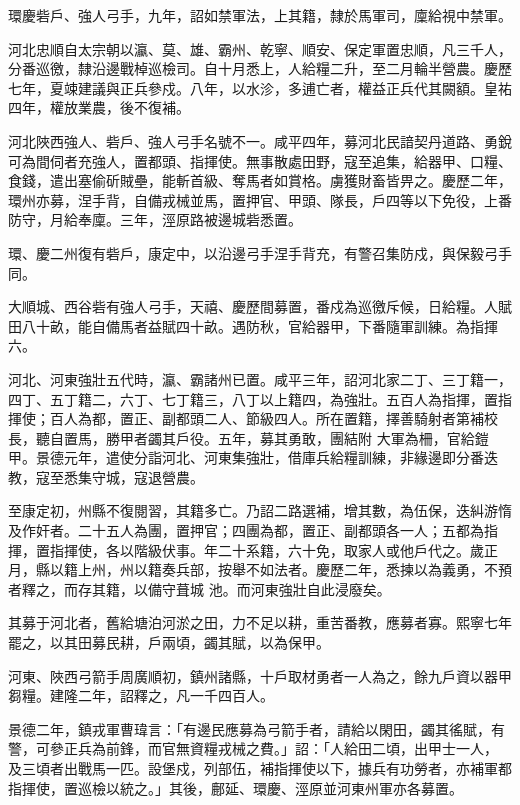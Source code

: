 \begin{pinyinscope}
 環慶砦戶、強人弓手，九年，詔如禁軍法，上其籍，隸於馬軍司，廩給視中禁軍。



 河北忠順自太宗朝以瀛、莫、雄、霸州、乾寧、順安、保定軍置忠順，凡三千人，分番巡徼，隸沿邊戰棹巡檢司。自十月悉上，人給糧二升，至二月輪半營農。慶歷七年，夏竦建議與正兵參戍。八年，以水沴，多逋亡者，權益正兵代其闕額。皇祐四年，權放業農，後不復補。



 河北陜西強人、砦戶、強人弓手名號不一。咸平四年，募河北民諳契丹道路、勇銳可為間伺者充強人，置都頭、指揮使。無事散處田野，寇至追集，給器甲、口糧、食錢，遣出塞偷斫賊壘，能斬首級、奪馬者如賞格。虜獲財畜皆畀之。慶歷二年，環州亦募，涅手背，自備戎械並馬，置押官、甲頭、隊長，戶四等以下免役，上番防守，月給奉廩。三年，涇原路被邊城砦悉置。



 環、慶二州復有砦戶，康定中，以沿邊弓手涅手背充，有警召集防戍，與保毅弓手同。



 大順城、西谷砦有強人弓手，天禧、慶歷間募置，番戍為巡徼斥候，日給糧。人賦田八十畝，能自備馬者益賦四十畝。遇防秋，官給器甲，下番隨軍訓練。為指揮六。



 河北、河東強壯五代時，瀛、霸諸州已置。咸平三年，詔河北家二丁、三丁籍一，四丁、五丁籍二，六丁、七丁籍三，八丁以上籍四，為強壯。五百人為指揮，置指揮使；百人為都，置正、副都頭二人、節級四人。所在置籍，擇善騎射者第補校長，聽自置馬，勝甲者蠲其戶役。五年，募其勇敢，團結附
 大軍為柵，官給鎧甲。景德元年，遣使分詣河北、河東集強壯，借庫兵給糧訓練，非緣邊即分番迭教，寇至悉集守城，寇退營農。



 至康定初，州縣不復閱習，其籍多亡。乃詔二路選補，增其數，為伍保，迭糾游惰及作奸者。二十五人為團，置押官；四團為都，置正、副都頭各一人；五都為指揮，置指揮使，各以階級伏事。年二十系籍，六十免，取家人或他戶代之。歲正月，縣以籍上州，州以籍奏兵部，按舉不如法者。慶歷二年，悉揀以為義勇，不預者釋之，而存其籍，以備守葺城
 池。而河東強壯自此浸廢矣。



 其募于河北者，舊給塘泊河淤之田，力不足以耕，重苦番教，應募者寡。熙寧七年罷之，以其田募民耕，戶兩頃，蠲其賦，以為保甲。



 河東、陜西弓箭手周廣順初，鎮州諸縣，十戶取材勇者一人為之，餘九戶資以器甲芻糧。建隆二年，詔釋之，凡一千四百人。



 景德二年，鎮戎軍曹瑋言：「有邊民應募為弓箭手者，請給以閑田，蠲其徭賦，有警，可參正兵為前鋒，而官無資糧戎械之費。」詔：「人給田二頃，出甲士一人，
 及三頃者出戰馬一匹。設堡戍，列部伍，補指揮使以下，據兵有功勞者，亦補軍都指揮使，置巡檢以統之。」其後，鄜延、環慶、涇原並河東州軍亦各募置。




\end{pinyinscope}
